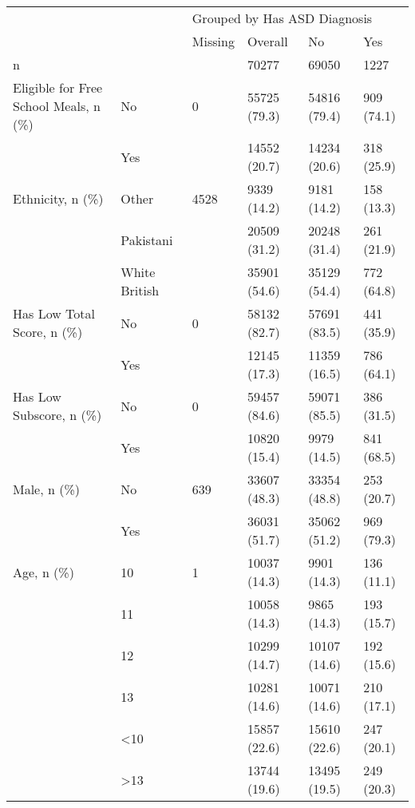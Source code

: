 \begin{tabular}{llllll}
\toprule
           &     & \multicolumn{4}{l}{Grouped by Has ASD Diagnosis} \\
           &     &                      Missing &       Overall &            No &         Yes \\
\midrule
n & {} &                              &         70277 &         69050 &        1227 \\
Eligible for Free School Meals, n (\%) & No &                            0 &  55725 (79.3) &  54816 (79.4) &  909 (74.1) \\
           & Yes &                              &  14552 (20.7) &  14234 (20.6) &  318 (25.9) \\
Ethnicity, n (\%) & Other &                         4528 &   9339 (14.2) &   9181 (14.2) &  158 (13.3) \\
           & Pakistani &                              &  20509 (31.2) &  20248 (31.4) &  261 (21.9) \\
           & White British &                              &  35901 (54.6) &  35129 (54.4) &  772 (64.8) \\
Has Low Total Score, n (\%) & No &                            0 &  58132 (82.7) &  57691 (83.5) &  441 (35.9) \\
           & Yes &                              &  12145 (17.3) &  11359 (16.5) &  786 (64.1) \\
Has Low Subscore, n (\%) & No &                            0 &  59457 (84.6) &  59071 (85.5) &  386 (31.5) \\
           & Yes &                              &  10820 (15.4) &   9979 (14.5) &  841 (68.5) \\
Male, n (\%) & No &                          639 &  33607 (48.3) &  33354 (48.8) &  253 (20.7) \\
           & Yes &                              &  36031 (51.7) &  35062 (51.2) &  969 (79.3) \\
Age, n (\%) & 10 &                            1 &  10037 (14.3) &   9901 (14.3) &  136 (11.1) \\
           & 11 &                              &  10058 (14.3) &   9865 (14.3) &  193 (15.7) \\
           & 12 &                              &  10299 (14.7) &  10107 (14.6) &  192 (15.6) \\
           & 13 &                              &  10281 (14.6) &  10071 (14.6) &  210 (17.1) \\
           & <10 &                              &  15857 (22.6) &  15610 (22.6) &  247 (20.1) \\
           & >13 &                              &  13744 (19.6) &  13495 (19.5) &  249 (20.3) \\
\bottomrule
\end{tabular}
